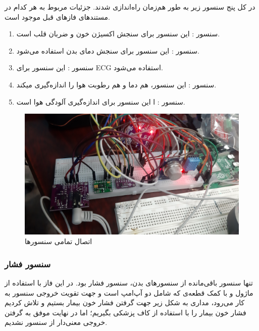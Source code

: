 \documentclass[12pt]{article}
\begin{document}
در کل پنج سنسور زیر به طور هم‌زمان راه‌اندازی شدند. جزئیات مربوط به هر کدام در مستندهای فازهای قبل موجود است.

\begin{enumerate}
	\item 
	سنسور : این سنسور برای سنجش اکسیژن خون و ضربان قلب است.
	
	\item 
	سنسور : این سنسور برای سنجش دمای بدن استفاده می‌شود.
	
	\item 
	سنسور : این سنسور برای ECG استفاده می‌شود.
	
	\item 
	سنسور : این سنسور، هم دما و هم رطوبت هوا را اندازه‌گیری میکند.
	
	\item 
	سنسور : ا این سنسور برای اندازه‌گیری آلودگی هوا است. 
\end{enumerate}




\begin{figure}[H]
	\begin{center}
		\includegraphics[width=.80\textwidth]{images/sensors.jpg}
	\end{center}
	\caption{اتصال تمامی سنسورها}
\end{figure}



\subsubsection{سنسور فشار}

تنها سنسور باقی‌مانده از سنسورهای بدن، سنسور فشار بود. در این فاز با استفاده از ماژول  و با کمک قطعه‌ی  که شامل دو آپ‌امپ است و جهت تقویت خروجی سنسور به کار می‌رود، مداری به شکل زیر جهت گرفتن فشار خون بیمار بستیم و تلاش کردیم فشار خون بیمار را با استفاده از کاف پزشکی بگیریم؛ اما در نهایت موفق به گرفتن خروجی معنی‌دار از سنسور نشدیم. 
\end{document}
